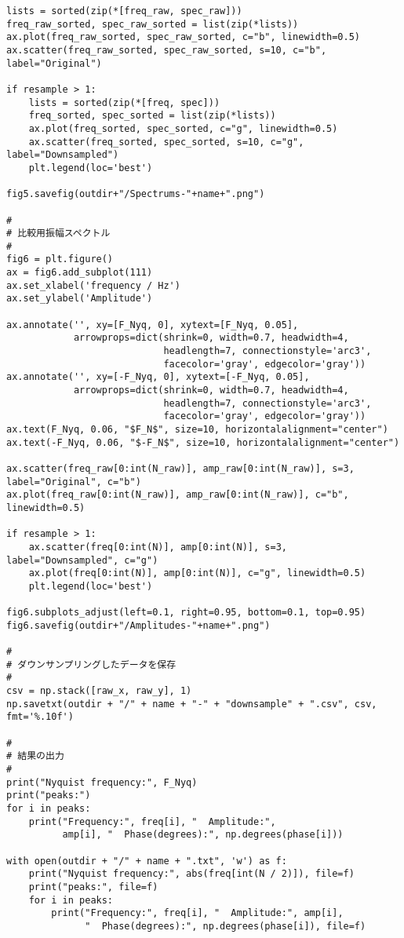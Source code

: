 \begin{lstlisting}[caption=FFT用pythonスクリプト,label=script]
lists = sorted(zip(*[freq_raw, spec_raw]))
freq_raw_sorted, spec_raw_sorted = list(zip(*lists))
ax.plot(freq_raw_sorted, spec_raw_sorted, c="b", linewidth=0.5)
ax.scatter(freq_raw_sorted, spec_raw_sorted, s=10, c="b", label="Original")

if resample > 1:
    lists = sorted(zip(*[freq, spec]))
    freq_sorted, spec_sorted = list(zip(*lists))
    ax.plot(freq_sorted, spec_sorted, c="g", linewidth=0.5)
    ax.scatter(freq_sorted, spec_sorted, s=10, c="g", label="Downsampled")
    plt.legend(loc='best')

fig5.savefig(outdir+"/Spectrums-"+name+".png")

#
# 比較用振幅スペクトル
#
fig6 = plt.figure()
ax = fig6.add_subplot(111)
ax.set_xlabel('frequency / Hz')
ax.set_ylabel('Amplitude')

ax.annotate('', xy=[F_Nyq, 0], xytext=[F_Nyq, 0.05],
            arrowprops=dict(shrink=0, width=0.7, headwidth=4,
                            headlength=7, connectionstyle='arc3',
                            facecolor='gray', edgecolor='gray'))
ax.annotate('', xy=[-F_Nyq, 0], xytext=[-F_Nyq, 0.05],
            arrowprops=dict(shrink=0, width=0.7, headwidth=4,
                            headlength=7, connectionstyle='arc3',
                            facecolor='gray', edgecolor='gray'))
ax.text(F_Nyq, 0.06, "$F_N$", size=10, horizontalalignment="center")
ax.text(-F_Nyq, 0.06, "$-F_N$", size=10, horizontalalignment="center")

ax.scatter(freq_raw[0:int(N_raw)], amp_raw[0:int(N_raw)], s=3, label="Original", c="b")
ax.plot(freq_raw[0:int(N_raw)], amp_raw[0:int(N_raw)], c="b", linewidth=0.5)

if resample > 1:
    ax.scatter(freq[0:int(N)], amp[0:int(N)], s=3, label="Downsampled", c="g")
    ax.plot(freq[0:int(N)], amp[0:int(N)], c="g", linewidth=0.5)
    plt.legend(loc='best')

fig6.subplots_adjust(left=0.1, right=0.95, bottom=0.1, top=0.95)
fig6.savefig(outdir+"/Amplitudes-"+name+".png")

#
# ダウンサンプリングしたデータを保存
#
csv = np.stack([raw_x, raw_y], 1)
np.savetxt(outdir + "/" + name + "-" + "downsample" + ".csv", csv, fmt='%.10f')

#
# 結果の出力
#
print("Nyquist frequency:", F_Nyq)
print("peaks:")
for i in peaks:
    print("Frequency:", freq[i], "  Amplitude:",
          amp[i], "  Phase(degrees):", np.degrees(phase[i]))

with open(outdir + "/" + name + ".txt", 'w') as f:
    print("Nyquist frequency:", abs(freq[int(N / 2)]), file=f)
    print("peaks:", file=f)
    for i in peaks:
        print("Frequency:", freq[i], "  Amplitude:", amp[i],
              "  Phase(degrees):", np.degrees(phase[i]), file=f)

\end{lstlisting}